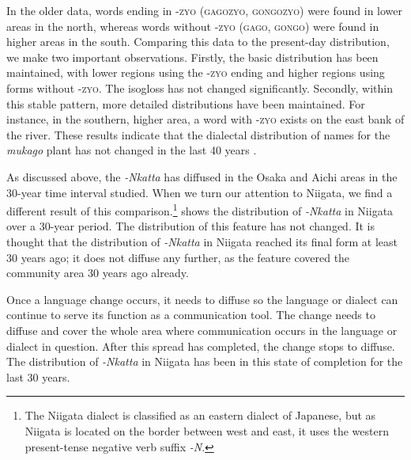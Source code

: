 \documentclass[output=paper]{LSP/langsci}
\begin{document}
In the older data, words ending in \textsc{-zyo} (\textsc{gagozyo}, \textsc{gongozyo}) were found in lower areas in the north, whereas words without \textsc{-zyo} (\textsc{gago}, \textsc{gongo}) were found in higher areas in the south. Comparing this data to the present-day distribution, we make two important observations. Firstly, the basic distribution has been maintained, with lower regions using the \textsc{-zyo} ending and higher regions using forms without \textsc{-zyo}. The isogloss has not changed significantly. Secondly, within this stable pattern, more detailed distributions have been maintained. For instance, in the southern, higher area, a word with \textsc{-zyo} exists on the east bank of the river. These results indicate that the dialectal distribution of names for the \textit{mukago} plant has not changed in the last 40 years \citep{onishi_relationship_inprint}.

As discussed above, the  \textit{-Nkatta} has diffused in the Osaka and Aichi areas in the 30-year time interval studied. When we turn our attention to Niigata, we find a different result of this  comparison.\footnote{ The Niigata dialect is classified as an eastern dialect of Japanese, but as Niigata is located on the border between west and east, it uses the western present-tense negative verb suffix \textit{-N}.}  shows the distribution of \textit{-Nkatta} in Niigata over a 30-year period. The distribution of this feature has not changed. It is thought that the distribution of \textit{-Nkatta} in Niigata reached its final form at least 30 years ago; it does not diffuse any further, as the feature covered the community area 30 years ago already.

Once a language change occurs, it needs to diffuse so the language or dialect can continue to serve its function as a communication tool. The change needs to diffuse and cover the whole area where communication occurs in the language or dialect in question. After this spread has completed, the change stops to diffuse. The distribution of \textit{-Nkatta} in Niigata has been in this state of completion for the last 30 years.
\end{document}
